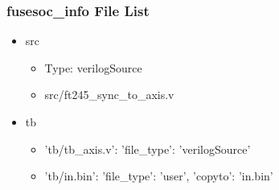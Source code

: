 \subsubsection{fusesoc\_info File List}
\begin{itemize}
\item src
	\begin{itemize}
	\item[$\space$] Type: verilogSource
	\item src/ft245\_sync\_to\_axis.v
	\end{itemize}
\item tb
	\begin{itemize}
	\item {'tb/tb\_axis.v': {'file\_type': 'verilogSource'}}
	\item {'tb/in.bin': {'file\_type': 'user', 'copyto': 'in.bin'}}
	\end{itemize}
\end{itemize}
